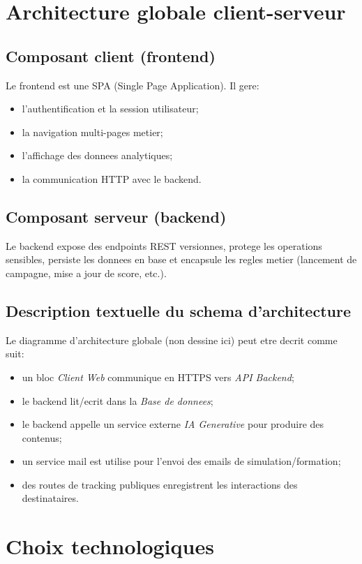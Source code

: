 \documentclass[12pt,a4paper,oneside]{report}
\begin{document}
\section{Architecture globale client-serveur}
\subsection{Composant client (frontend)}
Le frontend est une SPA (Single Page Application). Il gere:
\begin{itemize}[leftmargin=1.2cm]
  \item l'authentification et la session utilisateur;
  \item la navigation multi-pages metier;
  \item l'affichage des donnees analytiques;
  \item la communication HTTP avec le backend.
\end{itemize}

\subsection{Composant serveur (backend)}
Le backend expose des endpoints REST versionnes, protege les operations sensibles, persiste les donnees en base et encapsule les regles metier (lancement de campagne, mise a jour de score, etc.).

\subsection{Description textuelle du schema d'architecture}
Le diagramme d'architecture globale (non dessine ici) peut etre decrit comme suit:
\begin{itemize}[leftmargin=1.2cm]
  \item un bloc \textit{Client Web} communique en HTTPS vers \textit{API Backend};
  \item le backend lit/ecrit dans la \textit{Base de donnees};
  \item le backend appelle un service externe \textit{IA Generative} pour produire des contenus;
  \item un service mail est utilise pour l'envoi des emails de simulation/formation;
  \item des routes de tracking publiques enregistrent les interactions des destinataires.
\end{itemize}

\section{Choix technologiques}
\end{document}
